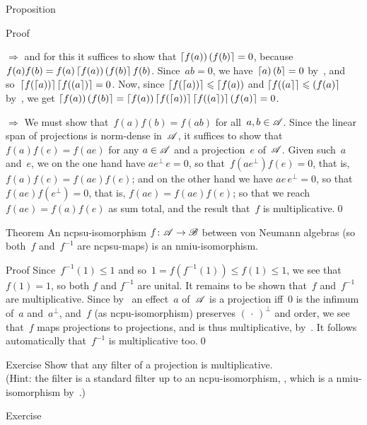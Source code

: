 \documentclass[a]{subfiles}
\begin{document}
\begin{parsec}
\begin{point}[gardner]{Proposition}
\begin{point}{Proof}
\begin{point}{$\Longrightarrow$}
and for this it suffices to show that
$\left\lceil f(a)\right)\left(f(b)\right\rceil=0$,
because $f(a)f(b)=f(a)\left\lceil f(a)\right)\left(f(b)\right\rceil f(b)$.
Since~$ab=0$,
we have~$\left\lceil a\right)\left(b\right\rceil=0$ by~,
and so~$\left\lceil f(\left\lceil a\right))\right\rceil\left\lceil f(\left(a\right\rceil)\right\rceil=0$.
Now,
since $\left\lceil f(\left\lceil a\right))\right\rceil\leqslant \left\lceil f(a)\right)$
	and $\left\lceil f(\left(a\right\rceil\right\rceil\leqslant \left(f(a)\right\rceil$
	by~,
we get $\left\lceil f(a)\right)\left(f(b)\right\rceil
	= \left\lceil f(a)\right) \left\lceil f(\left\lceil a\right))\right\rceil
	\left\lceil f(\left(a\right\rceil)\right\rceil
	\left(f(a)\right\rceil
	=0$.
\end{point}
\begin{point}{$\Longrightarrow$}%
We must show that~$f(a)f(b)=f(ab)$
for all~$a,b\in \mathscr{A}$.
Since the linear span of projections is norm-dense in~$\mathscr{A}$,
it suffices to show that $f(a)f(e)=f(ae)$
for any $a\in\mathscr{A}$ and a projection~$e$ of~$\mathscr{A}$.
Given such~$a$ and~$e$,
we on the one hand have $ae^\perp\, e=0$,
so that~$f(ae^\perp)f(e)=0$,
that is, $f(a)f(e)=f(ae)f(e)$;
and on the other hand
we have $ae\,e^\perp=0$,
so that~$f(ae)f(e^\perp)=0$,
that is, $f(ae)=f(ae)f(e)$;
so that we reach~$f(ae)=f(a)f(e)$ as sum total,
and the result that~$f$ is multiplicative.\qed
\end{point}
\end{point}
\end{point}
\begin{point}[iso]{Theorem}%
An ncpsu-isomorphism $f\colon \mathscr{A}\to\mathscr{B}$
between von Neumann algebras 
(so both~$f$ and~$f^{-1}$ are ncpsu-maps)
is an nmiu-isomorphism.
\begin{point}{Proof}%
Since~$f^{-1}(1)\leq 1$
and so~$1=f(f^{-1}(1))\leq f(1)\leq 1$,
we see that~$f(1)=1$, so both $f$ and $f^{-1}$ are unital.
It remains to be shown that~$f$ and~$f^{-1}$ are multiplicative.
Since by~ an effect~$a$ of~$\mathscr{A}$
is a projection iff~$0$ is the infimum of~$a$ and~$a^\perp$,
	and~$f$ (as ncpu-isomorphism) preserves $(\,\cdot\,)^\perp$
	and order,
we see that~$f$ maps projections to projections,
and is thus multiplicative, by~.
It follows automatically that~$f^{-1}$ is multiplicative too.\qed
\end{point}
\end{point}
\begin{point}{Exercise}%
Show that any filter of a projection is multiplicative.\\
(Hint: the filter is
a standard filter
up to an
ncpu-isomorphism, ,
which is a nmiu-isomorphism by~.)
\end{point}
\begin{point}{Exercise}%

\end{point}
\end{parsec}
\end{document}
